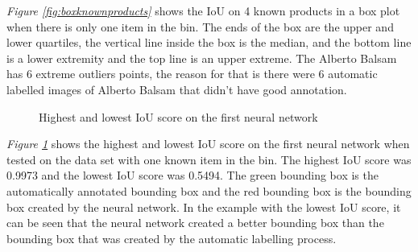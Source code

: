 \textit{Figure \ref{fig:boxknownproducts}} shows the IoU on 4 known products in a box plot when there is only one item in the bin. The ends of the box are the upper and lower quartiles, the vertical line inside the box is the median, and the bottom line is a lower extremity and the top line is an upper extreme. The Alberto Balsam has 6 extreme outliers points, the reason for that is there were 6 automatic labelled images of Alberto Balsam that didn’t have good annotation. 


\begin{figure}[h]
 \centering
 \hfill
 \caption{Highest and lowest IoU score on the first neural network}
 \label{figure: v1bestworst}
\end{figure}

\textit{Figure \ref{figure: v1bestworst}} shows the highest and lowest IoU score on the first neural network when tested on the data set with one known item in the bin. The highest IoU score was 0.9973 and the lowest IoU score was 0.5494. The green bounding box is the automatically annotated bounding box and the red bounding box is the bounding box created by the neural network. In the example with the lowest IoU score, it can be seen that the neural network created a better bounding box than the bounding box that was created by the automatic labelling process.

\clearpage
